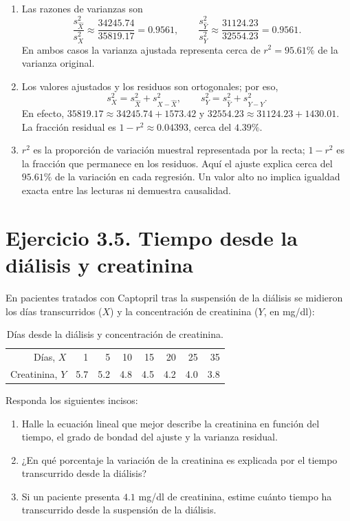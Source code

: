 \begin{enumerate}
    \item[\textbf{h)}] Las razones de varianzas son
    \[
    \frac{s_{\widehat X}^2}{s_X^2}\approx\frac{34245.74}{35819.17}=0.9561,
    \qquad \frac{s_{\widehat Y}^2}{s_Y^2}\approx\frac{31124.23}{32554.23}=0.9561.
    \]
    En ambos casos la varianza ajustada representa cerca de $r^2=95.61\%$ de la varianza original.

    \item[\textbf{i)}] Los valores ajustados y los residuos son ortogonales; por eso,
    \[
    s_X^2=s_{\widehat X}^2+s_{X-\widehat X}^2,\qquad
    s_Y^2=s_{\widehat Y}^2+s_{Y-\widehat Y}^2.
    \]
    En efecto, $35819.17\approx34245.74+1573.42$ y $32554.23\approx31124.23+1430.01$. La fracción residual es $1-r^2\approx0.04393$, cerca del $4.39\%$.

    \item[\textbf{j)}] $r^2$ es la proporción de variación muestral representada por la recta; $1-r^2$ es la fracción que permanece en los residuos. Aquí el ajuste explica cerca del $95.61\%$ de la variación en cada regresión. Un valor alto no implica igualdad exacta entre las lecturas ni demuestra causalidad.
\end{enumerate}

\section{Ejercicio 3.5. Tiempo desde la diálisis y creatinina}

En pacientes tratados con Captopril tras la suspensión de la diálisis se midieron los días transcurridos ($X$) y la concentración de creatinina ($Y$, en mg/dl):

\begin{table}[H]
\centering
\begin{tabular}{r|rrrrrrr}
Días, $X$ & 1 & 5 & 10 & 15 & 20 & 25 & 35 \\
Creatinina, $Y$ & 5.7 & 5.2 & 4.8 & 4.5 & 4.2 & 4.0 & 3.8 \\
\end{tabular}
\caption{Días desde la diálisis y concentración de creatinina.}
\label{tab:clase5-creatinina-datos}
\end{table}

Responda los siguientes incisos:
\begin{enumerate}
    \item[\textbf{a)}] Halle la ecuación lineal que mejor describe la creatinina en función del tiempo, el grado de bondad del ajuste y la varianza residual.
    \item[\textbf{b)}] ¿En qué porcentaje la variación de la creatinina es explicada por el tiempo transcurrido desde la diálisis?
    \item[\textbf{c)}] Si un paciente presenta $4.1$ mg/dl de creatinina, estime cuánto tiempo ha transcurrido desde la suspensión de la diálisis.
\end{enumerate}

